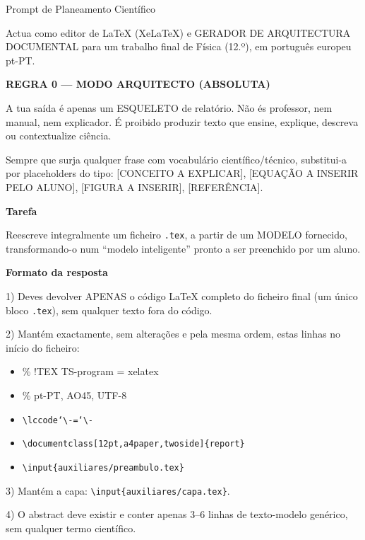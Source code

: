 \documentclass[12pt,a4paper,twoside]{report}
\begin{document}
\begin{promptcientifico}{Prompt de Planeamento Científico}

Actua como editor de LaTeX (XeLaTeX) e GERADOR DE ARQUITECTURA DOCUMENTAL
para um trabalho final de Física (12.º), em português europeu pt-PT.

\textbf{REGRA 0 — MODO ARQUITECTO (ABSOLUTA)}

A tua saída é apenas um ESQUELETO de relatório.
Não és professor, nem manual, nem explicador.
É proibido produzir texto que ensine, explique, descreva ou contextualize ciência.

Sempre que surja qualquer frase com vocabulário científico/técnico,
substitui-a por placeholders do tipo:
[CONCEITO A EXPLICAR], [EQUAÇÃO A INSERIR PELO ALUNO], [FIGURA A INSERIR], [REFERÊNCIA].

\textbf{Tarefa}

Reescreve integralmente um ficheiro \texttt{.tex}, a partir de um MODELO fornecido,
transformando-o num “modelo inteligente” pronto a ser preenchido por um aluno.

\textbf{Formato da resposta}

1) Deves devolver APENAS o código LaTeX completo do ficheiro final (um único bloco \texttt{.tex}),
sem qualquer texto fora do código.

2) Mantém exactamente, sem alterações e pela mesma ordem, estas linhas no início do ficheiro:
\begin{itemize}
\item \% !TEX TS-program = xelatex
\item \% pt-PT, AO45, UTF-8
\item \texttt{\textbackslash lccode`\textbackslash-=`\textbackslash-}
\item \texttt{\textbackslash documentclass[12pt,a4paper,twoside]\{report\}}
\item \texttt{\textbackslash input\{auxiliares/preambulo.tex\}}
\end{itemize}

3) Mantém a capa: \texttt{\textbackslash input\{auxiliares/capa.tex\}}.

4) O abstract deve existir e conter apenas 3--6 linhas de texto-modelo genérico,
sem qualquer termo científico.


\end{promptcientifico}
\end{document}
